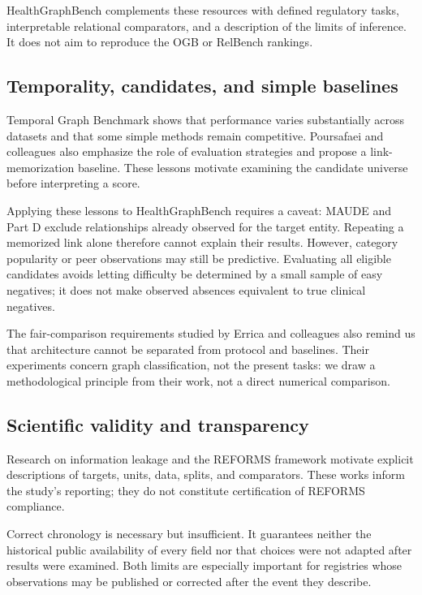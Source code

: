 HealthGraphBench complements these resources with defined regulatory tasks, interpretable relational comparators, and a description of the limits of inference. It does not aim to reproduce the OGB or RelBench rankings.

\subsection{Temporality, candidates, and simple baselines}

Temporal Graph Benchmark shows that performance varies substantially across datasets and that some simple methods remain competitive\cite{huang2023tgb}. Poursafaei and colleagues also emphasize the role of evaluation strategies and propose a link-memorization baseline\cite{poursafaei2022}. These lessons motivate examining the candidate universe before interpreting a score.

Applying these lessons to HealthGraphBench requires a caveat: MAUDE and Part D exclude relationships already observed for the target entity. Repeating a memorized link alone therefore cannot explain their results. However, category popularity or peer observations may still be predictive. Evaluating all eligible candidates avoids letting difficulty be determined by a small sample of easy negatives; it does not make observed absences equivalent to true clinical negatives.

The fair-comparison requirements studied by Errica and colleagues also remind us that architecture cannot be separated from protocol and baselines\cite{errica2020}. Their experiments concern graph classification, not the present tasks: we draw a methodological principle from their work, not a direct numerical comparison.

\subsection{Scientific validity and transparency}

Research on information leakage and the REFORMS framework motivate explicit descriptions of targets, units, data, splits, and comparators\cite{kapoor2023leakage,kapoor2024reforms}. These works inform the study's reporting; they do not constitute certification of REFORMS compliance.

Correct chronology is necessary but insufficient. It guarantees neither the historical public availability of every field nor that choices were not adapted after results were examined. Both limits are especially important for registries whose observations may be published or corrected after the event they describe.


